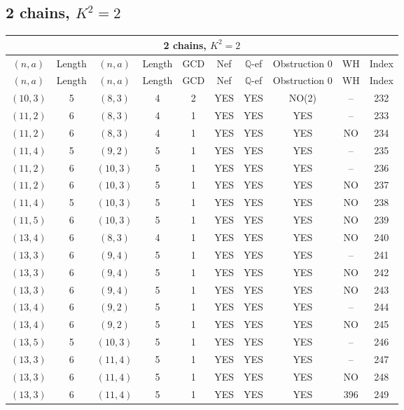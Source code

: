 \subsection{2 chains, $K^2 = 2$}
\begin{longtable}{|c|c|c|c|c|c|c|c|c|c|}
\hline
\multicolumn{10}{|c|}{2 chains, $K^2 = 2$}\\
\hline
$(n,a)$ & Length & $(n,a)$ & Length & GCD & Nef & $\mathbb Q$-ef & Obstruction 0 & WH & Index\\
\hline
\endfirsthead

\hline
$(n,a)$ & Length & $(n,a)$ & Length & GCD & Nef & $\mathbb Q$-ef & Obstruction 0 & WH & Index\\
\hline
\endhead
\hline
\endfoot

$(10, 3)$ & 5 & $(8, 3)$ & 4 & 2 & YES & YES & NO(2) & -- & 232\\
$(11, 2)$ & 6 & $(8, 3)$ & 4 & 1 & YES & YES & YES & -- & 233\\
$(11, 2)$ & 6 & $(8, 3)$ & 4 & 1 & YES & YES & YES & NO & 234\\
$(11, 4)$ & 5 & $(9, 2)$ & 5 & 1 & YES & YES & YES & -- & 235\\
$(11, 2)$ & 6 & $(10, 3)$ & 5 & 1 & YES & YES & YES & -- & 236\\
$(11, 2)$ & 6 & $(10, 3)$ & 5 & 1 & YES & YES & YES & NO & 237\\
$(11, 4)$ & 5 & $(10, 3)$ & 5 & 1 & YES & YES & YES & NO & 238\\
$(11, 5)$ & 6 & $(10, 3)$ & 5 & 1 & YES & YES & YES & NO & 239\\
$(13, 4)$ & 6 & $(8, 3)$ & 4 & 1 & YES & YES & YES & NO & 240\\
$(13, 3)$ & 6 & $(9, 4)$ & 5 & 1 & YES & YES & YES & -- & 241\\
$(13, 3)$ & 6 & $(9, 4)$ & 5 & 1 & YES & YES & YES & NO & 242\\
$(13, 3)$ & 6 & $(9, 4)$ & 5 & 1 & YES & YES & YES & NO & 243\\
$(13, 4)$ & 6 & $(9, 2)$ & 5 & 1 & YES & YES & YES & -- & 244\\
$(13, 4)$ & 6 & $(9, 2)$ & 5 & 1 & YES & YES & YES & NO & 245\\
$(13, 5)$ & 5 & $(10, 3)$ & 5 & 1 & YES & YES & YES & -- & 246\\
$(13, 3)$ & 6 & $(11, 4)$ & 5 & 1 & YES & YES & YES & -- & 247\\
$(13, 3)$ & 6 & $(11, 4)$ & 5 & 1 & YES & YES & YES & NO & 248\\
$(13, 3)$ & 6 & $(11, 4)$ & 5 & 1 & YES & YES & YES & 396 & 249\\

\end{longtable}
